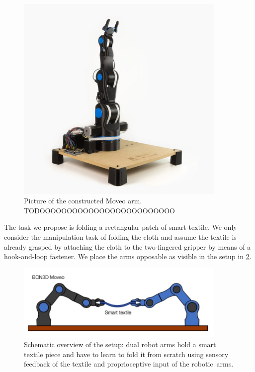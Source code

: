 \documentclass[\home/main.tex]{subfiles}
\begin{document}
\begin{figure}[htpb]
    \centering
    \includegraphics[width=0.9\textwidth, keepaspectratio]{figures/moveo_arm}
    \caption{Picture of the constructed Moveo arm. TODOOOOOOOOOOOOOOOOOOOOOOOOO}
    \label{fig:moveo_arm}
\end{figure}

The task we propose is folding a rectangular patch of smart textile. We only consider the manipulation task of folding the cloth and assume the textile is already grasped by attaching the cloth to the two-fingered gripper by means of a hook-and-loop fastener. We place the arms opposable as visible in the setup in \cref{fig:setup_overview}.

\begin{figure}[htpb]
    \centering
    \includegraphics[width=0.9\textwidth, keepaspectratio]{figures/folding_overview_smaller.jpg}
    \caption{Schematic overview of the setup: dual robot arms hold a smart textile piece and have to learn to fold it from scratch using sensory feedback of the textile and proprioceptive input of the robotic~arms. }
    \label{fig:setup_overview}
\end{figure}
\end{document}
